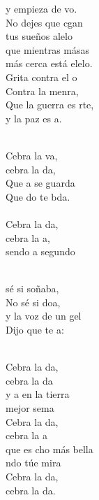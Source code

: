 \begin{cancion}
	y empieza de vo.\\
	No dejes que cgan\\
	tus sueños alelo\\
	que mientras másas\\
	más cerca está elelo.\\
	Grita contra el o\\
	Contra la menra,\\
	Que la guerra es rte,\\
	y la paz es a.\\\jump\\
	\begin{chorus}%
	Cebra la va, \\
	cebra la da,\\
	Que a se guarda\\
	Que do te bda.\\
\jump\\
	Cebra la da, \\
	cebra la a,\\
	sendo a segundo  \\
	\end{chorus}%
	\jump\\
	 sé si soñaba,\\
	No sé si doa, \\
	y la voz de un gel\\
	Dijo que te a:\\\jump\\
	\begin{chorus}%
	Cebra la da, \\
	cebra la da\\
	y a en la tierra\\
	 mejor sema\\
	Cebra la da, \\
	cebra la a\\
	que es cho más bella \\
	ndo túe mira\\
	Cebra la da,\\
	cebra la da.\\
	\end{chorus}%
	\jump\\
\end{cancion}%
